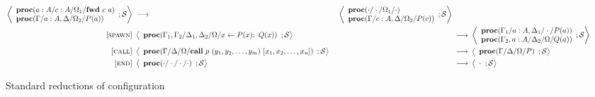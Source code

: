 \documentclass[12pt, openany]{memoir}
\newcommand*{\call}[3]{\textbf{call}\ #1\ (#2)\ [#3]}
\newcommand*{\fwd}[2]{\textbf{fwd}\ #1\ #2}
\newcommand*{\spawn}[3]{#3 \leftarrow #1(#3);\ #2(#3)}
\newcommand*{\procObj}[4]{\textbf{proc}(#1/#2/#3/#4)}
\newcommand*{\cancelSet}[0]{\mathcal{S}}
\begin{document}
\begin{figure}[H]
\begin{alignat}{4}
      \Braket{
        \begin{array}{l}
          \procObj{a : A}{c : A}{\Omega_1}{\fwd{c}{a}} \\
          \procObj{\Gamma}{a : A, \Delta}{\Omega_2}{P(a)}
        \end{array}
        ; \cancelSet
      } & ~ \longrightarrow & ~ 
      \Braket{
        \begin{array}{l}
          \procObj{\cdot}{\cdot}{\Omega_1}{\cdot} \\
          \procObj{\Gamma}{c : A, \Delta}{\Omega_2}{P(c)}
        \end{array}
        ; \cancelSet
    } \tag*{} \\
    \label{spawn} \textsc{[spawn]} & ~ 
      \Braket{
        \begin{array}{l}
          \procObj{\Gamma_1, \Gamma_2}{\Delta_1, \Delta_2}{\Omega}{\spawn{P}{Q}{x}}
        \end{array}
        ; \cancelSet
      } & ~ \longrightarrow & ~ 
      \Braket{
        \begin{array}{l}
          \procObj{\Gamma_1}{a : A, \Delta_1}{\cdot}{P(a)} \\
          \procObj{\Gamma_2, a : A}{\Delta_2}{\Omega}{Q(a)}
        \end{array}
        ; \cancelSet
    } \tag*{} \\
    \label{call} \textsc{[call]} & ~ 
      \Braket{
        \begin{array}{l}
          \procObj{\Gamma}{\Delta}{\Omega}{\call{p}{y_1, y_2, \ldots, y_m}{x_1, x_2, \ldots, x_n}}
        \end{array}
        ; \cancelSet
      } & ~ \longrightarrow & ~ 
      \Braket{
        \begin{array}{l}
          \procObj{\Gamma}{\Delta}{\Omega}{P}
        \end{array}
        ; \cancelSet
    } \tag*{} \\
    \label{finish} \textsc{[end]} & ~ 
      \Braket{
        \begin{array}{l}
          \procObj{\cdot}{\cdot}{\cdot}{\cdot}
        \end{array}
        ; \cancelSet
      } & ~ \longrightarrow & ~ 
      \Braket{
        \begin{array}{l}
          \cdot
        \end{array}
        ; \cancelSet
    } \tag*{}
  \end{alignat}
  \raggedleft
  \caption{Standard reductions of configuration}
  \label{fig:stdreduction}
\end{figure}
\end{document}
